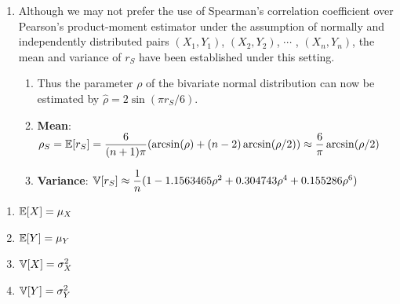 \begin{enumerate}[series=binvar-normal]
    \item Although we may not prefer the use of Spearman’s correlation coefficient over Pearson’s product-moment estimator under the assumption of normally and independently distributed pairs $(X_1, Y_1)$, $(X_2, Y_2)$, $\cdots$ , $(X_n , Y_n )$, the mean and variance of $r_S$ have been established under this setting.
    \hfill \cite{statistics/book/Statistics-for-Data-Scientists/Maurits-Kaptein}
    \begin{enumerate}
        \item Thus the parameter $\rho$ of the bivariate normal distribution can now be estimated by $\hat{\rho} = 2 \sin(\pi r_S /6)$.
        \hfill \cite{statistics/book/Statistics-for-Data-Scientists/Maurits-Kaptein}

        \item \textbf{Mean}:
        $
            \rho_S
            = \mathbb{E}[r_S]
            = \dfrac{6}{(n + 1)\pi} (\arcsin(\rho) + (n - 2) \arcsin(\rho/2))
            \approx \dfrac{6}{\pi} \arcsin(\rho/2)
        $
        \hfill \cite{statistics/book/Statistics-for-Data-Scientists/Maurits-Kaptein}

        \item \textbf{Variance}:
        $
            \mathbb{V}[r_S]
            \approx \dfrac{1}{ n} (1 - 1.1563465\rho^2 + 0.304743\rho^4 + 0.155286\rho^6)
        $
        \hfill \cite{statistics/book/Statistics-for-Data-Scientists/Maurits-Kaptein}
    \end{enumerate}


\end{enumerate}


\begin{multicols}{2}
\begin{enumerate}[resume*=binvar-normal]
    \item $\mathbb{E}[X] = \mu_X$
    \hfill \cite{statistics/book/Statistics-for-Data-Scientists/Maurits-Kaptein}

    \item $\mathbb{E}[Y] = \mu_Y$
    \hfill \cite{statistics/book/Statistics-for-Data-Scientists/Maurits-Kaptein}

    \item $\mathbb{V}[X] = \sigma^2_X$
    \hfill \cite{statistics/book/Statistics-for-Data-Scientists/Maurits-Kaptein}

    \item $\mathbb{V}[Y] = \sigma^2_Y$
    \hfill \cite{statistics/book/Statistics-for-Data-Scientists/Maurits-Kaptein}
\end{enumerate}
\end{multicols}




